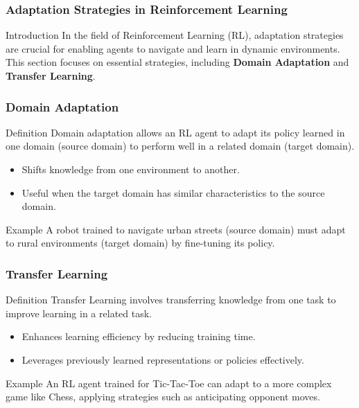 \documentclass[aspectratio=169]{beamer}
\begin{document}
\begin{frame}
    \frametitle{Adaptation Strategies in Reinforcement Learning}
    \begin{block}{Introduction}
        In the field of Reinforcement Learning (RL), adaptation strategies are crucial for enabling agents to navigate and learn in dynamic environments.
        This section focuses on essential strategies, including \textbf{Domain Adaptation} and \textbf{Transfer Learning}.
    \end{block}
\end{frame}

\begin{frame}
    \frametitle{Domain Adaptation}
    \begin{block}{Definition}
        Domain adaptation allows an RL agent to adapt its policy learned in one domain (source domain) to perform well in a related domain (target domain).
    \end{block}
    
    \begin{itemize}
        \item Shifts knowledge from one environment to another.
        \item Useful when the target domain has similar characteristics to the source domain.
    \end{itemize}
    
    \begin{block}{Example}
        A robot trained to navigate urban streets (source domain) must adapt to rural environments (target domain) by fine-tuning its policy.
    \end{block}
\end{frame}

\begin{frame}
    \frametitle{Transfer Learning}
    \begin{block}{Definition}
        Transfer Learning involves transferring knowledge from one task to improve learning in a related task.
    \end{block}
    
    \begin{itemize}
        \item Enhances learning efficiency by reducing training time.
        \item Leverages previously learned representations or policies effectively.
    \end{itemize}
    
    \begin{block}{Example}
        An RL agent trained for Tic-Tac-Toe can adapt to a more complex game like Chess, applying strategies such as anticipating opponent moves.
    \end{block}
\end{frame}
\end{document}
